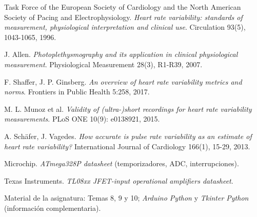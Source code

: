 \documentclass[11pt,a4paper]{article}
\begin{document}
\begin{enumerate}[leftmargin=1.6em,itemsep=2pt,topsep=2pt,label={[\arabic*]}]
  \item Task Force of the European Society of Cardiology and the North American Society of
        Pacing and Electrophysiology. \emph{Heart rate variability: standards of measurement,
        physiological interpretation and clinical use}. Circulation 93(5), 1043-1065, 1996.
  \item J. Allen. \emph{Photoplethysmography and its application in clinical physiological
        measurement}. Physiological Measurement 28(3), R1-R39, 2007.
  \item F. Shaffer, J. P. Ginsberg. \emph{An overview of heart rate variability metrics and
        norms}. Frontiers in Public Health 5:258, 2017.
  \item M. L. Munoz et al. \emph{Validity of (ultra-)short recordings for heart rate
        variability measurements}. PLoS ONE 10(9): e0138921, 2015.
  \item A. Schäfer, J. Vagedes. \emph{How accurate is pulse rate variability as an estimate of
        heart rate variability?} International Journal of Cardiology 166(1), 15-29, 2013.
  \item Microchip. \emph{ATmega328P datasheet} (temporizadores, ADC, interrupciones).
  \item Texas Instruments. \emph{TL08xx JFET-input operational amplifiers datasheet}.
  \item Material de la asignatura: Temas 8, 9 y 10; \emph{Arduino Python} y
        \emph{Tkinter Python} (información complementaria).
\end{enumerate}
\end{document}

